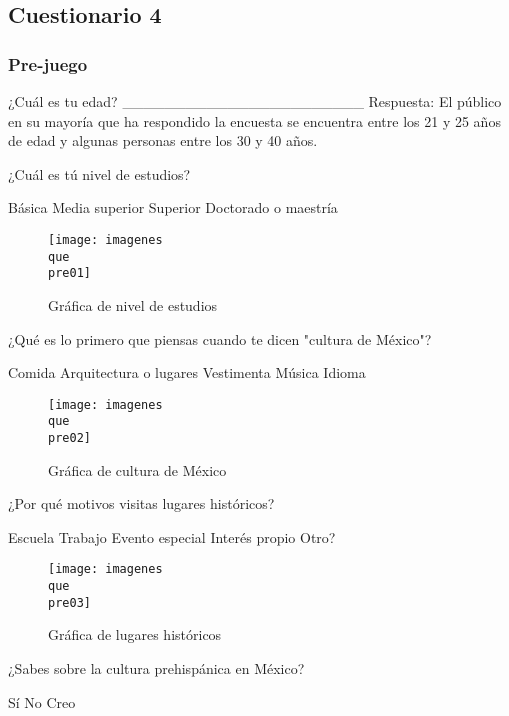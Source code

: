 \subsection{Cuestionario 4}

\subsubsection{Pre-juego}
\begin{questions}
	
	\question ¿Cuál es tu edad?
	_______________________
	Respuesta: El público en su mayoría que ha respondido la encuesta se encuentra entre los 21 y 25 años de edad y algunas personas entre los 30 y 40 años.
	
	\question ¿Cuál es tú nivel de estudios?
	\begin{checkboxes}
		\choice Básica
		\choice Media superior
		\choice Superior
		\choice Doctorado o maestría
	\end{checkboxes}

\begin{figure}
	\centering
	\caption{Gráfica de nivel de estudios}
	\label{fig:pre01}
	\texttt{[image: imagenes\\que\\pre01]}
\end{figure}

	
	\question ¿Qué es lo primero que piensas cuando te dicen "cultura de México"?
	\begin{checkboxes}
		\choice Comida
		\choice Arquitectura o lugares
		\choice Vestimenta
		\choice Música
		\choice Idioma	
	\end{checkboxes}

\begin{figure}
	\centering
	\caption{Gráfica de cultura de México}
	\label{fig:pre02}
	\texttt{[image: imagenes\\que\\pre02]}
\end{figure}

	
	\question ¿Por qué motivos visitas lugares históricos?
	\begin{checkboxes}
		\choice Escuela
		\choice Trabajo
		\choice Evento especial
		\choice Interés propio
		\choice Otro?
	\end{checkboxes}

\begin{figure}
	\centering
	\caption{Gráfica de lugares históricos}
	\label{fig:pre03}
	\texttt{[image: imagenes\\que\\pre03]}
\end{figure}

	
	\question ¿Sabes sobre la cultura prehispánica en México?
	\begin{checkboxes}
		\choice Sí
		\choice No
		\choice Creo
	\end{checkboxes}


\end{questions}
